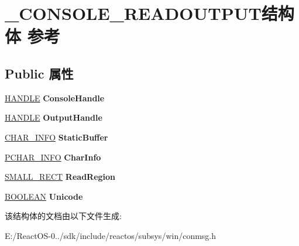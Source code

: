 \hypertarget{struct___c_o_n_s_o_l_e___r_e_a_d_o_u_t_p_u_t}{}\section{\+\_\+\+C\+O\+N\+S\+O\+L\+E\+\_\+\+R\+E\+A\+D\+O\+U\+T\+P\+U\+T结构体 参考}
\label{struct___c_o_n_s_o_l_e___r_e_a_d_o_u_t_p_u_t}
\subsection*{Public 属性}
\begin{DoxyCompactItemize}
\item 
\mbox{\label{struct___c_o_n_s_o_l_e___r_e_a_d_o_u_t_p_u_t_ae736d93b79b2d75ab6242971679dd43f}} 
\hyperlink{interfacevoid}{H\+A\+N\+D\+LE} {\bfseries Console\+Handle}
\item 
\mbox{\label{struct___c_o_n_s_o_l_e___r_e_a_d_o_u_t_p_u_t_aae2bf3775295042d7b90e76ce2d84e7e}} 
\hyperlink{interfacevoid}{H\+A\+N\+D\+LE} {\bfseries Output\+Handle}
\item 
\mbox{\label{struct___c_o_n_s_o_l_e___r_e_a_d_o_u_t_p_u_t_ad9891eeb0c2b6d41b56eccbc9a078c7d}} 
\hyperlink{struct___c_h_a_r___i_n_f_o}{C\+H\+A\+R\+\_\+\+I\+N\+FO} {\bfseries Static\+Buffer}
\item 
\mbox{\label{struct___c_o_n_s_o_l_e___r_e_a_d_o_u_t_p_u_t_a1a9df6db0e047d95b3d68461f5327879}} 
\hyperlink{struct___c_h_a_r___i_n_f_o}{P\+C\+H\+A\+R\+\_\+\+I\+N\+FO} {\bfseries Char\+Info}
\item 
\mbox{\label{struct___c_o_n_s_o_l_e___r_e_a_d_o_u_t_p_u_t_ab3715adc7c90b0f667b3b49f05674e66}} 
\hyperlink{structtag_s_m_a_l_l___r_e_c_t}{S\+M\+A\+L\+L\+\_\+\+R\+E\+CT} {\bfseries Read\+Region}
\item 
\mbox{\label{struct___c_o_n_s_o_l_e___r_e_a_d_o_u_t_p_u_t_a702d2778b5b893442cc2a0358657407f}} 
\hyperlink{_processor_bind_8h_a112e3146cb38b6ee95e64d85842e380a}{B\+O\+O\+L\+E\+AN} {\bfseries Unicode}
\end{DoxyCompactItemize}


该结构体的文档由以下文件生成\+:\begin{DoxyCompactItemize}
\item 
E\+:/\+React\+O\+S-\/0../sdk/include/reactos/subsys/win/conmsg.\+h\end{DoxyCompactItemize}
